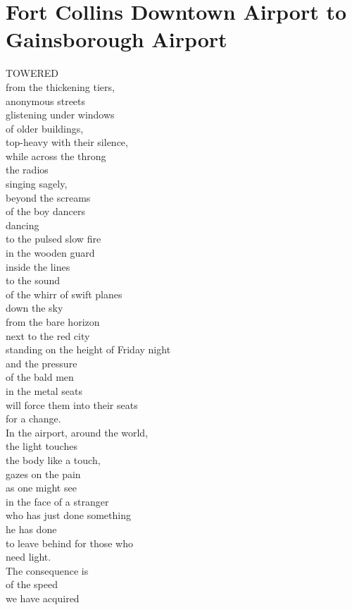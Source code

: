 \documentclass[smalldemyvopaper,11pt,twoside,onecolumn,openright,extrafontsizes]{memoir}
\begin{document}
\chapter{Fort Collins Downtown Airport to Gainsborough Airport}
TOWERED
\\from the thickening tiers,
\\anonymous streets
\\glistening under windows
\\of older buildings,
\\top-heavy with their silence,
\\while across the throng
\\the radios
\\singing sagely,
\\beyond the screams
\\of the boy dancers
\\dancing
\\to the pulsed slow fire
\\in the wooden guard
\\inside the lines
\\to the sound
\\of the whirr of swift planes
\\down the sky
\\from the bare horizon
\\next to the red city
\\standing on the height of Friday night
\\and the pressure
\\of the bald men
\\in the metal seats
\\will force them into their seats
\\for a change.
\\In the airport, around the world,
\\the light touches
\\the body like a touch,
\\gazes on the pain
\\as one might see
\\in the face of a stranger
\\who has just done something
\\he has done
\\to leave behind for those who
\\need light.
\\The consequence is
\\of the speed
\\we have acquired
\end{document}
